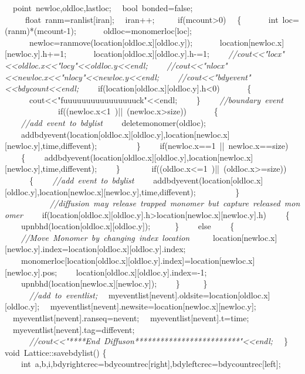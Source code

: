 {\ \ point\ newloc,oldloc,lastloc;
\ \ bool\ bonded=false;
\ \ \
\ \ float\ ranm=ranlist[iran];
\ \ iran++;
\ \ \
\ \ if(mcount>{}0)
\ \ \{
\ \ \ \ \ \ int\ loc=(ranm)*(mcount-{}1);
\ \ \ \ \ \ oldloc=monomerloc[loc];
\ \ \ \ \ \ newloc=ranmove(location[oldloc.x][oldloc.y]);
\ \ \ \ \ \ location[newloc.x][newloc.y].h+=1;
\ \ \ \ \ \ location[oldloc.x][oldloc.y].h-{}=1;
\ \ \ \ \textsl{//cout<{}<{}"{}locx"{}<{}<{}oldloc.x<{}<{}"{}locy"{}<{}<{}oldloc.y<{}<{}endl;}
\ \ \ \ \textsl{//cout<{}<{}"{}nlocx"{}<{}<{}newloc.x<{}<{}"{}nlocy"{}<{}<{}newloc.y<{}<{}endl;}
\ \ \ \ \textsl{//cout<{}<{}"{}bdyevent"{}<{}<{}bdycount<{}<{}endl;}
\ \ \ \ if(location[oldloc.x][oldloc.y].h<{}0)
\ \ \ \ \ \ \{
\ \ \ \ \ \ cout<{}<{}"{}fuuuuuuuuuuuuuuuuck"{}<{}<{}endl;
\ \ \ \ \}
\ \ \ \ \textsl{//boundary\ event}
\ \ \ \ \ \ \ \ \
\ \ \ \ if((newloc.x<{}1\ )||\ (newloc.x>{}size))
\ \ \ \ \ \ \{
\ \ \ \ \textsl{//add\ event\ to\ bdylist}
\ \ \ \ deletemonomer(oldloc);
\ \ \ \ addbdyevent(location[oldloc.x][oldloc.y],location[newloc.x][newloc.y],time,diffevent);
\ \ \ \ \
\ \ \ \ \}
\ \ \ \ if(newloc.x==1\ ||\ newloc.x==size)
\ \ \ \ \{
\ \ \ \ addbdyevent(location[oldloc.x][oldloc.y],location[newloc.x][newloc.y],time,diffevent);
\ \ \ \ \}
\ \ \
\ \ \ \ if((oldloc.x<{}=1\ )||\ (oldloc.x>{}=size))
\ \ \ \ \ \ \{
\ \ \ \ \textsl{//add\ event\ to\ bdylist}
\ \ \ \ addbdyevent(location[oldloc.x][oldloc.y],location[newloc.x][newloc.y],time,diffevent);
\ \ \ \ \
\ \ \ \ \}
\ \ \ \ \ \ \
\ \ \ \ \textsl{//diffusion\ may\ release\ trapped\ monomer\ but\ capture\ released\ monomer}
\ \ \ \ if(location[oldloc.x][oldloc.y].h>{}location[newloc.x][newloc.y].h)
\ \ \ \ \{
\ \ \ \ upnbhd(location[oldloc.x][oldloc.y]);\ \
\ \ \ \ \}
\ \ \ \ else
\ \ \ \ \{
\ \ \ \ \textsl{//Move\ Monomer\ by\ changing\ index\ location\ }
\ \ \ \ location[newloc.x][newloc.y].index=location[oldloc.x][oldloc.y].index;
\ \ \ \ monomerloc[location[oldloc.x][oldloc.y].index]=location[newloc.x][newloc.y].pos;
\ \ \ \ location[oldloc.x][oldloc.y].index=-{}1;
\ \ \ \ upnbhd(location[newloc.x][newloc.y]);
\ \ \ \ \}
\ \ \
\ \ \}
\ \ \ \
\ \ \textsl{//add\ to\ eventlist;}
\ \ myeventlist[nevent].oldsite=location[oldloc.x][oldloc.y];
\ \ myeventlist[nevent].newsite=location[newloc.x][newloc.y];
\ \ myeventlist[nevent].ranseq=nevent;
\ \ myeventlist[nevent].t=time;
\ \ myeventlist[nevent].tag=diffevent;
\ \ \ \
\ \ \textsl{//cout<{}<{}"{}****End\ Diffuson*************************"{}<{}<{}endl;\ \ }
\}
void\ Lattice::savebdylist()
\{
\ \ \ \ int\ a,b,i,bdyrightcrec=bdycountrec[right],bdyleftcrec=bdycountrec[left];

}
